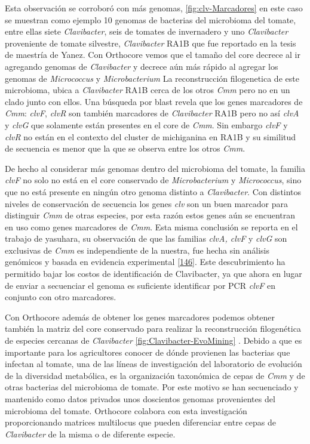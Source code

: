 \documentclass[12pt,twoside]{reedthesis}
\begin{document}
  Esta observación se corroboró con más genomas,
  \autoref{fig:clv-Marcadores} en este caso se muestran como ejemplo 10
  genomas de bacterias del microbioma del tomate, entre ellas siete
  \emph{Clavibacter}, seis de tomates de invernadero y uno
  \emph{Clavibacter} proveniente de tomate silvestre, \emph{Clavibacter}
  RA1B que fue reportado en la tesis de maestría de Yanez. Con Orthocore
  vemos que el tamaño del core decrece al ir agregando genomas de
  \emph{Clavibacter} y decrece aún más rápido al agregar los genomas de
  \emph{Micrococcus} y \emph{Microbacterium} La reconstrucción
  filogenetica de este microbioma, ubica a \emph{Clavibacter} RA1B cerca
  de los otros \emph{Cmm} pero no en un clado junto con ellos. Una
  búsqueda por blast revela que los genes marcadores de \emph{Cmm}:
  \emph{clvF}, \emph{clvR} son también marcadores de \emph{Clavibacter}
  RA1B pero no así \emph{clvA} y \emph{clvG} que solamente están presentes
  en el core de \emph{Cmm}. Sin embargo \emph{clvF} y \emph{clvR} no están
  en el contexto del cluster de michiganina en RA1B y su similitud de
  secuencia es menor que la que se observa entre los otros \emph{Cmm}.
  
  De hecho al considerar más genomas dentro del microbioma del tomate, la
  familia \emph{clvF} no solo no está en el core conservado de
  \emph{Microbacterium} y \emph{Micrococcus}, sino que no está presente en
  ningún otro genoma distinto a \emph{Clavibacter}. Con distintos niveles
  de conservación de secuencia los genes \emph{clv} son un buen marcador
  para distinguir \emph{Cmm} de otras especies, por esta razón estos genes
  aún se encuentran en uso como genes marcadores de \emph{Cmm}. Esta misma
  conclusión se reporta en el trabajo de yasuhara, su observación de que
  las familias \emph{clvA, clvF} y \emph{clvG} son exclusivas de
  \emph{Cmm} es independiente de la nuestra, fue hecha sin análisis
  genómicos y basada en evidencia experimental
  {[}\protect\hyperlink{ref-yasuhara-bell_genes_2014}{146}{]}. Este
  descubrimiento ha permitido bajar los costos de identificación de
  Clavibacter, ya que ahora en lugar de enviar a secuenciar el genoma es
  suficiente identificar por PCR \emph{clvF} en conjunto con otro
  marcadores.
  
  Con Orthocore además de obtener los genes marcadores podemos obtener
  también la matriz del core conservado para realizar la reconstrucción
  filogenética de especies cercanas de \emph{Clavibacter}
  \autoref{fig:Clavibacter-EvoMining} . Debido a que es importante para
  los agricultores conocer de dónde provienen las bacterias que infectan
  al tomate, una de las líneas de investigación del laboratorio de
  evolución de la diversidad metabólica, es la organización taxonómica de
  cepas de \emph{Cmm} y de otras bacterias del microbioma de tomate. Por
  este motivo se han secuenciado y mantenido como datos privados unos
  doscientos genomas provenientes del microbioma del tomate. Orthocore
  colabora con esta investigación proporcionando matrices multilocus que
  pueden diferenciar entre cepas de \emph{Clavibacter} de la misma o de
  diferente especie.
  
\end{document}
